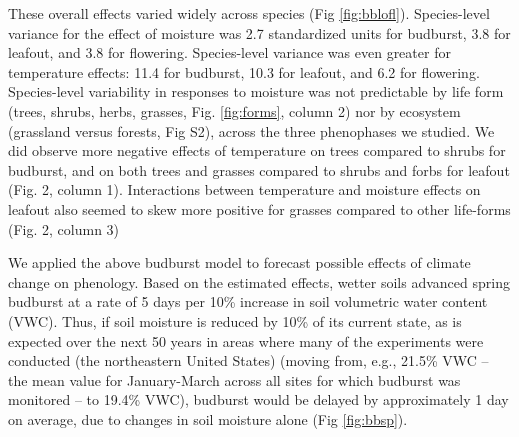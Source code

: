 \documentclass{article}
\begin{document}
\par These overall effects varied widely across species (Fig \ref{fig:bblofl}). Species-level variance for the effect of moisture was 2.7 standardized units for budburst, 3.8 for leafout, and 3.8 for flowering. Species-level variance was even greater for temperature effects: 11.4 for budburst, 10.3 for leafout, and 6.2 for flowering. Species-level variability in responses to moisture was not predictable by life form (trees, shrubs, herbs, grasses, Fig. \ref{fig:forms}, column 2)  nor by ecosystem (grassland versus forests, Fig S2), across the three phenophases we studied. We did observe more negative effects of temperature on trees compared to shrubs for budburst, and on both trees and grasses compared to shrubs and forbs for leafout (Fig. 2, column 1). Interactions between temperature and moisture effects on leafout also seemed to skew more positive for grasses compared to other life-forms (Fig. 2, column 3)
\par We applied the above budburst model to forecast possible effects of climate change on phenology. Based on the estimated effects, wetter soils advanced spring budburst at a rate of 5 days per 10\% increase in soil volumetric water content (VWC). Thus, if soil moisture is reduced by 10\% of its current state, as is expected over the next 50 years in areas where many of the experiments were conducted (the northeastern United States) \citep{berg2017} (moving from, e.g., 21.5\% VWC -- the mean value for January-March across all sites for which budburst was monitored -- to 19.4\% VWC), budburst would be delayed by approximately 1 day on average, due to changes in soil moisture alone (Fig \ref{fig:bbsp}).

\end{document}
